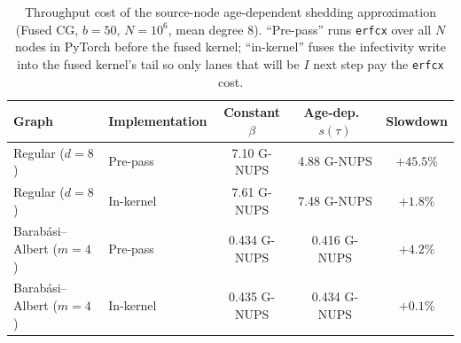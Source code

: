 \documentclass[a4paper,fleqn]{cas-sc}
\theoremstyle{definition}
\theoremstyle{remark}
\begin{document}
\begin{table}[!h]
\caption{Throughput cost of the source-node age-dependent shedding approximation (Fused CG, $b=50$, $N=10^6$, mean degree 8). ``Pre-pass'' runs \texttt{erfcx} over all $N$ nodes in PyTorch before the fused kernel; ``in-kernel'' fuses the infectivity write into the fused kernel's tail so only lanes that will be $I$ next step pay the \texttt{erfcx} cost.}
\label{tab:agedep_overhead}
\centering
\begin{tabular*}{\tblwidth}{@{}llccc@{}}
\toprule
\textbf{Graph} & \textbf{Implementation} & \textbf{Constant $\beta$} & \textbf{Age-dep.\ $s(\tau)$} & \textbf{Slowdown} \\
\midrule
Regular ($d=8$)     & Pre-pass   & 7.10 G-NUPS & 4.88 G-NUPS & $+45.5\%$ \\
Regular ($d=8$)     & In-kernel  & 7.61 G-NUPS & 7.48 G-NUPS & $+1.8\%$  \\
\midrule
Barab\'{a}si--Albert ($m=4$) & Pre-pass   & 0.434 G-NUPS & 0.416 G-NUPS & $+4.2\%$ \\
Barab\'{a}si--Albert ($m=4$) & In-kernel  & 0.435 G-NUPS & 0.434 G-NUPS & $+0.1\%$ \\
\bottomrule
\end{tabular*}
\end{table}
\end{document}
